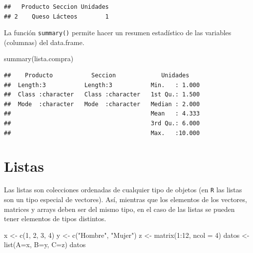 \documentclass[
]{book}
\newenvironment{Shaded}{\begin{snugshade}}{\end{snugshade}}
\newcommand{\AttributeTok}[1]{\textcolor[rgb]{0.77,0.63,0.00}{#1}}
\newcommand{\DecValTok}[1]{\textcolor[rgb]{0.00,0.00,0.81}{#1}}
\newcommand{\FunctionTok}[1]{\textcolor[rgb]{0.00,0.00,0.00}{#1}}
\newcommand{\NormalTok}[1]{#1}
\newcommand{\OtherTok}[1]{\textcolor[rgb]{0.56,0.35,0.01}{#1}}
\newcommand{\SpecialCharTok}[1]{\textcolor[rgb]{0.00,0.00,0.00}{#1}}
\newcommand{\StringTok}[1]{\textcolor[rgb]{0.31,0.60,0.02}{#1}}
\theoremstyle{break}
\begin{document}
\begin{verbatim}
##   Producto Seccion Unidades
## 2    Queso Lácteos        1
\end{verbatim}

La función \texttt{summary()} permite hacer un resumen estadístico de las
variables (columnas) del data.frame.

\begin{Shaded}
\begin{Highlighting}[]
\FunctionTok{summary}\NormalTok{(lista.compra)}
\end{Highlighting}
\end{Shaded}

\begin{verbatim}
##    Producto           Seccion             Unidades     
##  Length:3           Length:3           Min.   : 1.000  
##  Class :character   Class :character   1st Qu.: 1.500  
##  Mode  :character   Mode  :character   Median : 2.000  
##                                        Mean   : 4.333  
##                                        3rd Qu.: 6.000  
##                                        Max.   :10.000
\end{verbatim}

\hypertarget{listas}{%
\section{Listas}\label{listas}}

Las listas son colecciones ordenadas de cualquier tipo de objetos (en \texttt{R} las
listas son un tipo especial de vectores). Así, mientras que los elementos de
los vectores, matrices y arrays deben ser del mismo tipo, en el caso de las
listas se pueden tener elementos de tipos distintos.

\begin{Shaded}
\begin{Highlighting}[]
\NormalTok{x }\OtherTok{\textless{}{-}} \FunctionTok{c}\NormalTok{(}\DecValTok{1}\NormalTok{, }\DecValTok{2}\NormalTok{, }\DecValTok{3}\NormalTok{, }\DecValTok{4}\NormalTok{)}
\NormalTok{y }\OtherTok{\textless{}{-}} \FunctionTok{c}\NormalTok{(}\StringTok{"Hombre"}\NormalTok{, }\StringTok{"Mujer"}\NormalTok{)}
\NormalTok{z }\OtherTok{\textless{}{-}} \FunctionTok{matrix}\NormalTok{(}\DecValTok{1}\SpecialCharTok{:}\DecValTok{12}\NormalTok{, }\AttributeTok{ncol =} \DecValTok{4}\NormalTok{)}
\NormalTok{datos }\OtherTok{\textless{}{-}} \FunctionTok{list}\NormalTok{(}\AttributeTok{A=}\NormalTok{x, }\AttributeTok{B=}\NormalTok{y, }\AttributeTok{C=}\NormalTok{z)}
\NormalTok{datos}
\end{Highlighting}
\end{Shaded}
\end{document}
